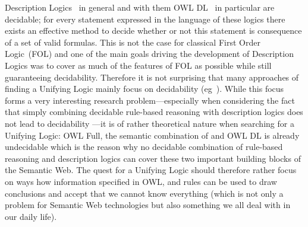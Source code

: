Description Logics~\cite{dl} in general and with them OWL DL~\cite{owldsem} in particular are decidable; for every statement expressed in the language of these logics there
exists an effective method to decide whether or not this statement is consequence of a set of valid formulas. This is not the case for classical 
First Order Logic~(FOL) and one of the main goals driving the development of Description Logics was to cover as much of the features of FOL as possible while still guaranteeing 
decidability. Therefore it is not surprising that many approaches of finding a Unifying Logic mainly focus on decidability (eg~\cite{unilogic,dllog}). 
While this focus forms a very interesting research problem---especially when considering the fact that simply combining decidable rule-based reasoning with description logics 
does not lead to decidability \cite{orl}---it is of rather theoretical nature when searching for a Unifying Logic: OWL Full, 
the semantic combination of \rdf and OWL DL is already undecidable which is the reason why no decidable combination of rule-based reasoning and description logics can cover these 
two important building blocks of the Semantic Web.
%
% 
The quest for a Unifying Logic should therefore rather focus on ways how information specified in OWL, \rdf and rules can be used to draw conclusions
and accept that we cannot know everything (which is not only a problem  for Semantic Web technologies but also something we all deal with in our daily life). 

